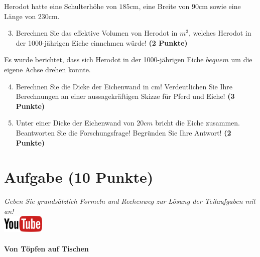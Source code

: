 \documentclass[a4paper, 10pt]{scrartcl}\usepackage[]{graphicx}\usepackage[]{xcolor}
\begin{document}
Herodot hatte eine Schulterh{\"o}he von $185$cm, eine Breite von
$90$cm sowie eine L{\"a}nge von  $230$cm.

\begin{enumerate}
  \setcounter{enumi}{2}
\item Berechnen Sie das effektive Volumen von Herodot in $m^3$, welches
  Herodot in der 1000-j{\"a}hrigen Eiche einnehmen w{\"u}rde! \textbf{(2 Punkte)}
\end{enumerate}

Es wurde berichtet, dass sich Herodot in der 1000-j{\"a}hrigen Eiche
$bequem$ um die eigene Achse drehen konnte.

\begin{enumerate}
  \setcounter{enumi}{3}
\item Berechnen Sie die Dicke der Eichenwand in cm! Verdeutlichen Sie Ihre
  Berechnungen an einer aussagekr{\"a}ftigen Skizze f{\"u}r Pferd und Eiche! \textbf{(3 Punkte)} 
\item Unter einer Dicke der Eichenwand von $20cm$ bricht
  die Eiche zusammen. Beantworten Sie die Forschungsfrage! Begr{\"u}nden Sie
  Ihre Antwort! \textbf{(2 Punkte)} 
\end{enumerate}
 
\clearpage

\section{Aufgabe \hfill (10 Punkte)}

\textit{Geben Sie grunds{\"a}tzlich Formeln und Rechenweg zur L{\"o}sung der
  Teilaufgaben mit an!} \\[1Ex]

\hfill\href{https://youtu.be/57B-yYoFSk0}{\includegraphics[width =
  2cm]{img/youtube}} %
\hspace{2Ex}

\paragraph{Von T{\"o}pfen auf Tischen}
\end{document}
